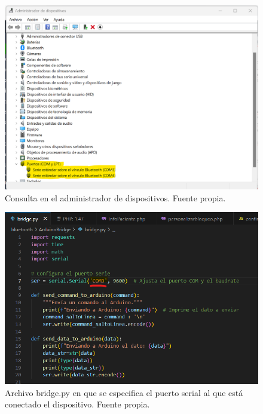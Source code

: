 \begin{enumerate}
\begin{itemize}
            \begin{figure}[h]
                \centering
                \includegraphics[width=1\textwidth]{img/admindispositivos.png}
                \caption{Consulta en el administrador de dispositivos. Fuente propia.}
                \label{fig:admintareas}
            \end{figure}
            \begin{figure}[h]
                \centering
                \includegraphics[width=1\textwidth]{img/bridgepy.png}
                \caption{Archivo bridge.py en que se especifica el puerto serial al que está conectado el dispositivo. Fuente propia.}
                \label{fig:bridgepy}
            \end{figure}
            \begin{figure}[h]
                \centering

\end{figure}
\end{itemize}
\end{enumerate}
